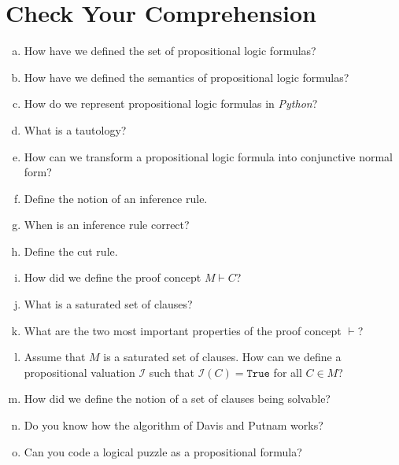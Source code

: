 \section{Check Your Comprehension}
\begin{enumerate}[(a)]
\item How have we defined the set of propositional logic formulas?
\item How have we defined the semantics of propositional logic formulas?
\item How do we represent propositional logic formulas in \textsl{Python}?
\item What is a tautology?
\item How can we transform a propositional logic formula into conjunctive normal
      form?
\item Define the notion of an inference rule.
\item When is an inference rule correct?
\item Define the cut rule.
\item How did we define the proof concept $M \vdash C$?
\item What is a saturated set of clauses?
\item What are the two most important properties of the proof concept $\vdash$?
\item Assume that $M$ is a saturated set of clauses. How can we define a propositional valuation
      $\mathcal{I}$ such that $\mathcal{I}(C) = \mathtt{True}$ for all $C \in M$?
\item How did we define the notion of a set of clauses being solvable?
\item Do you know how the algorithm of Davis and Putnam works?
\item Can you code a logical puzzle as a propositional formula?
\end{enumerate}


%

